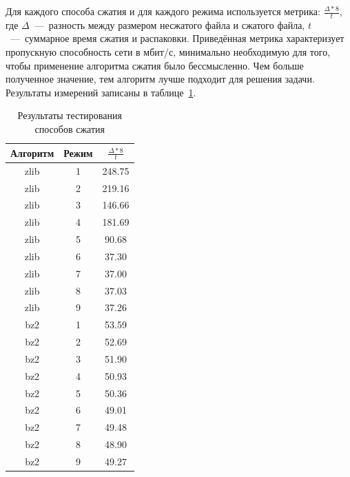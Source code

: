 \documentclass[12pt,a4paper,oneside]{extarticle}
\begin{document}
            Для каждого способа сжатия и для каждого режима используется метрика: $\frac{\Delta*8}{t}$, где $\Delta$~---~разность между размером несжатого файла и сжатого файла, $t$~---~суммарное время сжатия и распаковки. Приведённая метрика характеризует пропускную способность сети в мбит/с, минимально необходимую для того, чтобы применение алгоритма сжатия было бессмысленно. Чем больше полученное значение, тем алгоритм лучше подходит для решения задачи. Результаты измерений записаны в таблице~\ref{table:compress}.

            \begin{table}[h!]
                \centering
                \begin{tabular}{|c|c|c|}
                    \hline
                    Алгоритм & Режим & $\frac{\Delta*8}{t}$ \\
                    \hline
                    zlib & 1 & 248.75 \\
                    zlib & 2 & 219.16 \\        
                    zlib & 3 & 146.66 \\
                    zlib & 4 & 181.69 \\
                    zlib & 5 & 90.68 \\
                    zlib & 6 & 37.30 \\
                    zlib & 7 & 37.00 \\
                    zlib & 8 & 37.03 \\
                    zlib & 9 & 37.26 \\
                    bz2 & 1 & 53.59 \\
                    bz2 & 2 & 52.69 \\
                    bz2 & 3 & 51.90 \\
                    bz2 & 4 & 50.93 \\
                    bz2 & 5 & 50.36 \\
                    bz2 & 6 & 49.01 \\
                    bz2 & 7 & 49.48 \\
                    bz2 & 8 & 48.90 \\
                    bz2 & 9 & 49.27 \\
                    \hline        
                \end{tabular}
           
                \caption{Результаты тестирования способов сжатия}
                \label{table:compress}
            \end{table}
\end{document}
